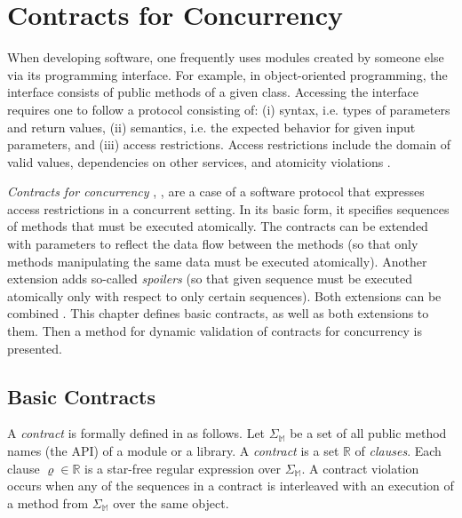 %
%
%


\chapter{Contracts for Concurrency}
\label{chThree}

When developing software, one frequently uses modules created by someone else
via its programming interface. For example, in object-oriented programming, the
interface consists of public methods of a given class. Accessing the interface
requires one to follow a protocol consisting of: (i) syntax, i.e. types of
parameters and return values, (ii) semantics, i.e. the expected behavior for
given input parameters, and (iii) access restrictions. Access restrictions
include the domain of valid values, dependencies on other services, and
atomicity violations \cite{contracts}.

\emph{Contracts for concurrency} \cite{FITPUB10817},
\cite{DBLP:journals/corr/SousaDFL15}, are a case of a software protocol that
expresses access restrictions in a concurrent setting. In its basic form, it
specifies sequences of methods that must be executed atomically. The contracts
can be extended with parameters to reflect the data flow between the methods (so
that only methods manipulating the same data must be executed atomically).
Another extension adds so-called \emph{spoilers} (so that given sequence must be
executed atomically only with respect to only certain sequences). Both
extensions can be combined \cite{contracts}. This chapter defines basic
contracts, as well as both extensions to them. Then a method for dynamic
validation of contracts for concurrency is presented.

\section{Basic Contracts}
\label{basicContracts}

A \emph{contract} is formally defined in \cite{FITPUB10817} as follows. Let
$\Sigma_\mathbb{M}$ be a set of all public method names (the API) of a module or
a library. A \emph{contract} is a set $\mathbb{R}$ of \emph{clauses}. Each
clause $\varrho \in \mathbb{R}$ is a star-free regular expression over
$\Sigma_\mathbb{M}$. A contract violation occurs when any of the sequences in a
contract is interleaved with an execution of a method from $\Sigma_\mathbb{M}$
over the same object.

